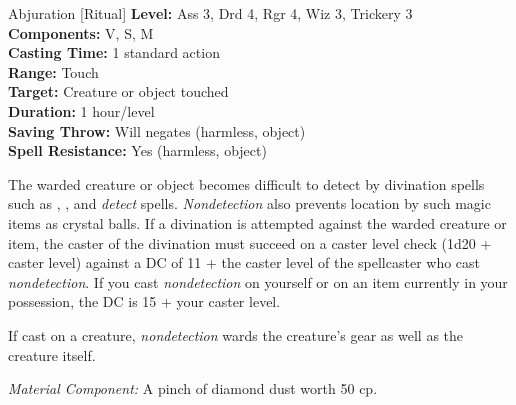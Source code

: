 {Abjuration [Ritual]}
{
	\textbf{Level:}
	Ass 3, Drd 4, Rgr 4, Wiz 3, Trickery 3\\
	\textbf{Components:}
	V, S, M\\
	\textbf{Casting Time:}
	1 standard action\\
	\textbf{Range:}
	Touch\\
	\textbf{Target:}
	Creature or object touched\\
	\textbf{Duration:}
	1 hour/level\\
	\textbf{Saving Throw:}
	Will negates (harmless, object)\\
	\textbf{Spell Resistance:}
	Yes (harmless, object)\\
}
{
	The warded creature or object becomes difficult to detect by divination spells such as , , and \emph{detect} spells. \emph{Nondetection} also prevents location by such magic items as crystal balls. If a divination is attempted against the warded creature or item, the caster of the divination must succeed on a caster level check (1d20 + caster level) against a DC of 11 + the caster level of the spellcaster who cast \emph{nondetection}. If you cast \emph{nondetection} on yourself or on an item currently in your possession, the DC is 15 + your caster level.

	If cast on a creature, \emph{nondetection} wards the creature's gear as well as the creature itself.

	\textit{Material Component:}
	A pinch of diamond dust worth 50 cp.

}
